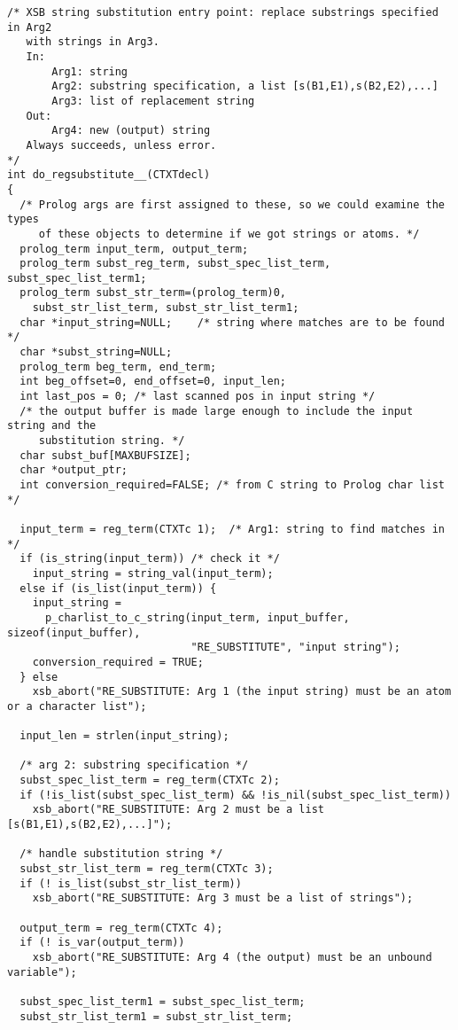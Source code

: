 {\small 
\begin{verbatim}
/* XSB string substitution entry point: replace substrings specified in Arg2
   with strings in Arg3.
   In: 
       Arg1: string
       Arg2: substring specification, a list [s(B1,E1),s(B2,E2),...]
       Arg3: list of replacement string
   Out:
       Arg4: new (output) string
   Always succeeds, unless error.
*/
int do_regsubstitute__(CTXTdecl)
{
  /* Prolog args are first assigned to these, so we could examine the types
     of these objects to determine if we got strings or atoms. */
  prolog_term input_term, output_term;
  prolog_term subst_reg_term, subst_spec_list_term, subst_spec_list_term1;
  prolog_term subst_str_term=(prolog_term)0,
    subst_str_list_term, subst_str_list_term1;
  char *input_string=NULL;    /* string where matches are to be found */
  char *subst_string=NULL;
  prolog_term beg_term, end_term;
  int beg_offset=0, end_offset=0, input_len;
  int last_pos = 0; /* last scanned pos in input string */
  /* the output buffer is made large enough to include the input string and the
     substitution string. */
  char subst_buf[MAXBUFSIZE];
  char *output_ptr;
  int conversion_required=FALSE; /* from C string to Prolog char list */

  input_term = reg_term(CTXTc 1);  /* Arg1: string to find matches in */
  if (is_string(input_term)) /* check it */
    input_string = string_val(input_term);
  else if (is_list(input_term)) {
    input_string =
      p_charlist_to_c_string(input_term, input_buffer, sizeof(input_buffer),
                             "RE_SUBSTITUTE", "input string");
    conversion_required = TRUE;
  } else
    xsb_abort("RE_SUBSTITUTE: Arg 1 (the input string) must be an atom or a character list");

  input_len = strlen(input_string);

  /* arg 2: substring specification */
  subst_spec_list_term = reg_term(CTXTc 2);
  if (!is_list(subst_spec_list_term) && !is_nil(subst_spec_list_term))
    xsb_abort("RE_SUBSTITUTE: Arg 2 must be a list [s(B1,E1),s(B2,E2),...]");

  /* handle substitution string */
  subst_str_list_term = reg_term(CTXTc 3);
  if (! is_list(subst_str_list_term))
    xsb_abort("RE_SUBSTITUTE: Arg 3 must be a list of strings");

  output_term = reg_term(CTXTc 4);
  if (! is_var(output_term))
    xsb_abort("RE_SUBSTITUTE: Arg 4 (the output) must be an unbound variable");

  subst_spec_list_term1 = subst_spec_list_term;
  subst_str_list_term1 = subst_str_list_term;


\end{verbatim}}
